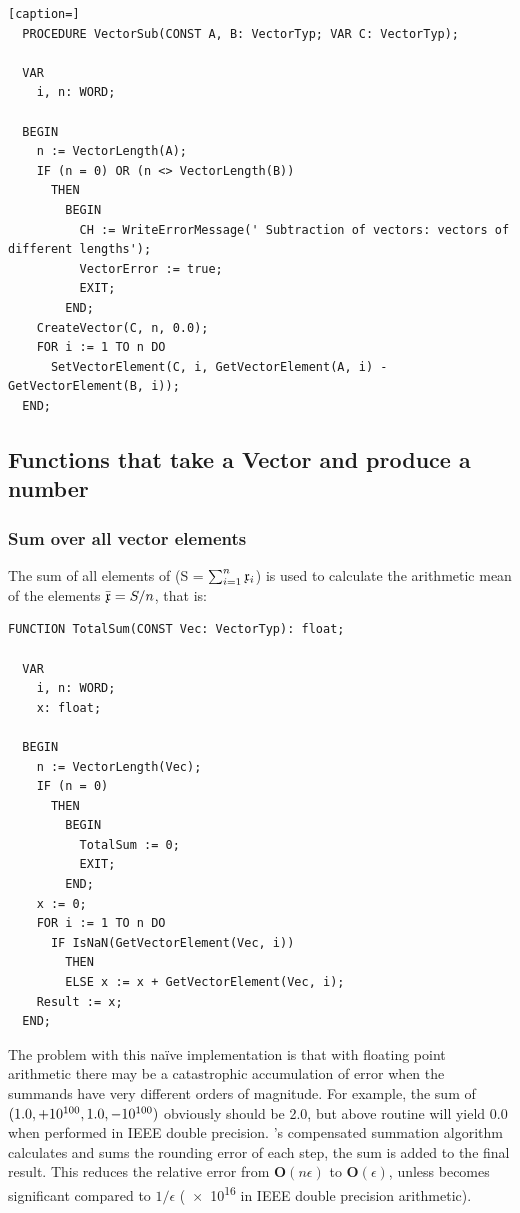 \begin{refsection}
\begin{lstlisting}[caption=]
  PROCEDURE VectorSub(CONST A, B: VectorTyp; VAR C: VectorTyp);

  VAR
    i, n: WORD;

  BEGIN
    n := VectorLength(A);
    IF (n = 0) OR (n <> VectorLength(B))
      THEN
        BEGIN
          CH := WriteErrorMessage(' Subtraction of vectors: vectors of different lengths');
          VectorError := true;
          EXIT;
        END;
    CreateVector(C, n, 0.0);
    FOR i := 1 TO n DO
      SetVectorElement(C, i, GetVectorElement(A, i) - GetVectorElement(B, i));
  END;
\end{lstlisting}


\subsection{Functions that take a Vector and produce a number }

\subsubsection{Sum over all vector elements}

The sum of all elements of  (S = \(\sum_{i=1}^n{\mathfrak{x}_i} \)) is used to calculate the arithmetic mean of the elements \(\bar{\mathfrak{x}} = S/n \), that is:

\begin{lstlisting}[caption=Grand total of vector elements]
  FUNCTION TotalSum(CONST Vec: VectorTyp): float;

  VAR
    i, n: WORD;
    x: float;

  BEGIN
    n := VectorLength(Vec);
    IF (n = 0)
      THEN
        BEGIN
          TotalSum := 0;
          EXIT;
        END;
    x := 0;
    FOR i := 1 TO n DO
      IF IsNaN(GetVectorElement(Vec, i))
        THEN
        ELSE x := x + GetVectorElement(Vec, i);
    Result := x;
  END;
\end{lstlisting}

The problem with this na{\"i}ve implementation is that with floating point arithmetic there may be a catastrophic accumulation of error when the summands have very different orders of magnitude. For example, the sum of \((1.0, +\num{e100}, 1.0, \num{-e100}) \) obviously should be \num{2.0}, but above routine will yield \num{0.0} when performed in IEEE double precision. 's compensated summation algorithm calculates and sums the rounding error of each step, the sum is added to the final result. This reduces the relative error from \(\mathbf{O}(n \epsilon) \) to \(\mathbf{O}(\epsilon) \), unless  becomes significant compared to \(1/\epsilon \)  (\num{e16} in IEEE double precision arithmetic).


\end{refsection}
